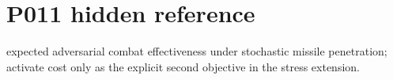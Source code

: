 \section*{P011 hidden reference}\nMaximize expected adversarial combat effectiveness under stochastic missile penetration; activate cost only as the explicit second objective in the stress extension.\n